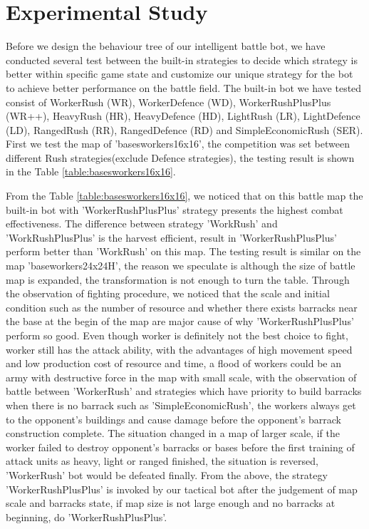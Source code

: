 \section{Experimental Study}

Before we design the behaviour tree of our intelligent battle bot, we have conducted
several test between the built-in strategies to decide which strategy is better within
specific game state and customize our unique strategy for the bot to achieve better
performance on the battle field. The built-in bot we have tested consist of WorkerRush (WR),
WorkerDefence (WD), WorkerRushPlusPlus (WR++), HeavyRush (HR), HeavyDefence (HD),
LightRush (LR), LightDefence (LD), RangedRush (RR), RangedDefence (RD) and
SimpleEconomicRush (SER). First we test the map of 'basesworkers16x16', the
competition was set between different Rush strategies(exclude Defence strategies), the
testing result is shown in the Table \ref{table:basesworkers16x16}.



From the Table \ref{table:basesworkers16x16}, we noticed that on this battle map the built-in
bot with 'WorkerRushPlusPlus' strategy presents the highest combat effectiveness. The difference
between strategy 'WorkRush' and 'WorkRushPlusPlus' is the harvest efficient, result in
'WorkerRushPlusPlus' perform better than 'WorkRush' on this map. The testing result is similar
on the map 'baseworkers24x24H', the reason we speculate is although the size of battle map is
expanded, the transformation is not enough to turn the table. Through the observation of fighting
procedure, we noticed that the scale and initial condition such as the number of resource and
whether there exists barracks near the base at the begin of the map are major cause of why
'WorkerRushPlusPlus' perform so good. Even though worker is definitely not the best choice to
fight, worker still has the attack ability, with the advantages of high movement speed and low
production cost of resource and time, a flood of workers could be an army with destructive force
in the map with small scale, with the observation of battle between 'WorkerRush' and strategies
which have priority to build barracks when there is no barrack such as 'SimpleEconomicRush', the
workers always get to the opponent's buildings and cause damage before the opponent's barrack construction
complete. The situation changed in a map of larger scale, if the worker failed to destroy opponent's
barracks or bases before the first training of attack units as heavy, light or ranged finished, the
situation is reversed, 'WorkerRush' bot would be defeated finally. From the above, the strategy
'WorkerRushPlusPlus' is invoked by our tactical bot after the judgement of map scale and barracks
state, if map size is not large enough and no barracks at beginning, do 'WorkerRushPlusPlus'.

